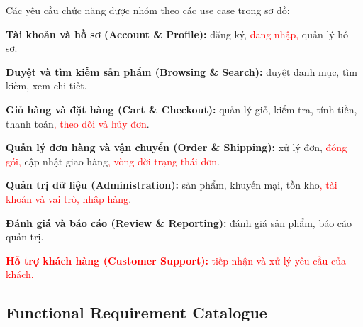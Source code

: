 \documentclass[12pt,a4paper,oneside]{report}
\newif\ifmark \marktrue
\newcommand{\chg}[1]{\ifmark\textcolor{red}{#1}\else #1\fi}
\begin{document}
Các yêu cầu chức năng được nhóm theo các use case trong sơ đồ:

\begin{enumerate}
  \item \textbf{Tài khoản và hồ sơ (Account \& Profile):} đăng ký, \chg{đăng nhập, }quản lý hồ sơ.
  \item \textbf{Duyệt và tìm kiếm sản phẩm (Browsing \& Search):} duyệt danh mục, tìm kiếm, xem chi tiết.
  \item \textbf{Giỏ hàng và đặt hàng (Cart \& Checkout):} quản lý giỏ, kiểm tra, tính tiền, thanh toán\chg{, theo dõi và hủy đơn}.
  \item \textbf{Quản lý đơn hàng và vận chuyển (Order \& Shipping):} xử lý đơn, \chg{đóng gói, }cập nhật giao hàng\chg{, vòng đời trạng thái đơn}.
  \item \textbf{Quản trị dữ liệu (Administration):} sản phẩm, khuyến mại, tồn kho\chg{, tài khoản và vai trò, nhập hàng}.
  \item \textbf{Đánh giá và báo cáo (Review \& Reporting):} đánh giá sản phẩm, báo cáo quản trị.
  \chg{\item \textbf{Hỗ trợ khách hàng (Customer Support):} tiếp nhận và xử lý yêu cầu của khách.}
\end{enumerate}

\subsection{Functional Requirement Catalogue}
\end{document}
